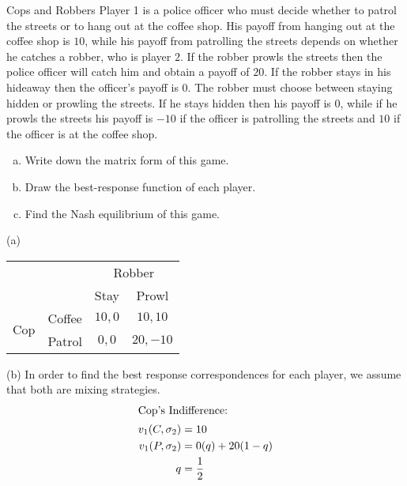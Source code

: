 \documentclass[8pt]{extarticle}
\title{}
\author{Avinash Iyer}
\date{}
\begin{document}
  \begin{problem}{Cops and Robbers}
    Player 1 is a police officer who must decide whether to patrol the streets or to hang out at the coffee shop. His payoff from hanging out at the coffee shop is $10$, while his payoff from patrolling the streets depends on whether he catches a robber, who is player $2$. If the robber prowls the streets then the police officer will catch him and obtain a payoff of $20$. If the robber stays in his hideaway then the officer's payoff is $0$. The robber must choose between staying hidden or prowling the streets. If he stays hidden then his payoff is $0$, while if he prowls the streets his payoff is $-10$ if the officer is patrolling the streets and $10$ if the officer is at the coffee shop.
    \begin{enumerate}[(a)]
      \item Write down the matrix form of this game.
      \item Draw the best-response function of each player.
      \item Find the Nash equilibrium of this game.
    \end{enumerate}
    \tcblower
    \begin{problem}{(a)}
      \begin{center}
        \renewcommand{\arraystretch}{1.5}
        \begin{tabular}{cc|c|c|}
          &\multicolumn{1}{c}{} & \multicolumn{2}{c}{Robber}\\
          &\multicolumn{1}{c}{} & \multicolumn{1}{c}{Stay} & \multicolumn{1}{c}{Prowl} \\
          \cline{3-4}
          \multirow{2}{1em}{Cop} & Coffee & $10,0$ & $10,10$\\
          \cline{3-4}
                                 & Patrol & $0,0$ & $20,-10$\\
                                 \cline{3-4}
        \end{tabular}
      \end{center}
    \end{problem}
    \begin{problem}{(b)}
      In order to find the best response correspondences for each player, we assume that both are mixing strategies.
      \begin{align*}
        \shortintertext{Cop's Indifference:}
        v_1(C,\sigma_2) &= 10\\
        v_1(P,\sigma_2) &= 0(q) + 20 (1-q)\\
        q &= \frac{1}{2}\\

\end{align*}
\end{problem}
\end{problem}
\end{document}
